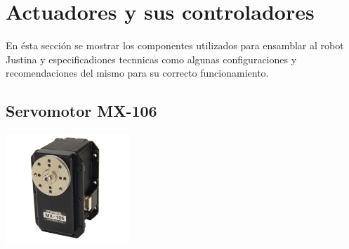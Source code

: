 \documentclass[a4paper,usenames,dvipsnames,svgnames,table]{book}
\begin{document}
\section{Actuadores y sus controladores}
En ésta sección se mostrar los componentes utilizados para ensamblar al robot Justina y especificadiones tecnnicas como
algunas configuraciones y recomendaciones del mismo para su correcto funcionamiento.


\subsection{Servomotor MX-106}

\begin{center}
\includegraphics[width=0.35\textwidth]{Figures/Hardware/Partes/MX-106.png}
\label{fig:Hardware:Partes:MX-106}
\end{center}
\end{document}
